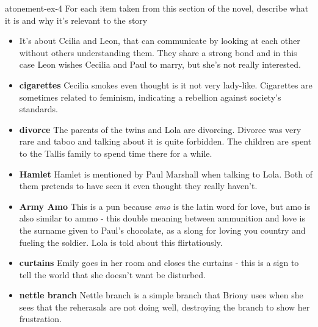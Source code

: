 \documentclass[preview]{standalone}
\begin{document}
\begin{snippetexercise}{atonement-ex-4}%
{For each item taken from this section of the novel, describe what it is and why it's relevant to the
story}
\begin{itemize}
    \item \textbf{}
        It's about Ccilia and Leon, that can communicate by looking at each other
        without others understanding them. They share a strong bond and in this case
        Leon wishes Cecilia and Paul to marry, but she's not really interested.
    \item \textbf{cigarettes}
        Cecilia smokes even thought is it not very lady-like.
        Cigarettes are sometimes related to feminism,
        indicating a rebellion against society's standards.
    \item \textbf{divorce}
        The parents of the twins and Lola are divorcing. Divorce was
        very rare and taboo and talking about it is quite forbidden.
        The children are spent to the Tallis family to spend time there
        for a while.
    \item \textbf{Hamlet}
        Hamlet is mentioned by Paul Marshall when talking to Lola.
        Both of them pretends to have seen it even thought they really haven't.
    \item \textbf{Army Amo}
        This is a pun because \textit{amo} is the latin word for love,
        but amo is also similar to ammo - this double meaning between
        ammunition and love is the surname given to Paul's chocolate,
        as a slong for loving you country and fueling the soldier.
        Lola is told about this flirtatiously.
    \item \textbf{curtains}
        Emily goes in her room and closes the curtains - this is a sign
        to tell the world that she doesn't want be disturbed.
    \item \textbf{nettle branch}
        Nettle branch is a simple branch that Briony uses when she sees that the reherasals
        are not doing well, destroying the branch to show her frustration.
\end{itemize}
\end{snippetexercise}
\end{document}
